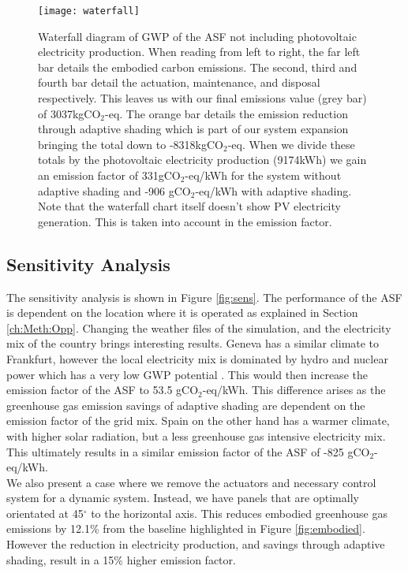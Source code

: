 \begin{figure}[H]
\begin{center}
\texttt{[image: waterfall]}
\caption{Waterfall diagram of GWP of the ASF not including photovoltaic electricity production. When reading from left to right, the far left bar details the embodied carbon emissions. The second, third and fourth bar detail the actuation, maintenance, and disposal respectively. This leaves us with our final emissions value (grey bar) of 3037kgCO$_2$-eq. The orange bar details the emission reduction through adaptive shading which is part of our system expansion bringing the total down to -8318kgCO$_2$-eq. When we divide these totals by the photovoltaic electricity production (9174kWh) we gain an emission factor of 331gCO$_2$-eq/kWh for the system without adaptive shading and -906 gCO$_2$-eq/kWh with adaptive shading. Note that the waterfall chart itself doesn't show PV electricity generation. This is taken into account in the emission factor.}

\label{fig:waterfall}
\end{center}
\end{figure}



\subsection{Sensitivity Analysis}


The sensitivity analysis is shown in Figure \ref{fig:sens}. The performance of the ASF is dependent on the location where it is operated as explained in Section \ref{ch:Meth:Opp}. Changing the weather files of the simulation, and the electricity mix of the country brings interesting results. Geneva has a similar climate to Frankfurt, however the local electricity mix is dominated by hydro and nuclear power which has a very low GWP potential \cite{itten2012life}. This would then increase the emission factor of the ASF to 53.5 gCO$_{2}$-eq/kWh. This difference arises as the greenhouse gas emission savings of adaptive shading are dependent on the emission factor of the grid mix.
Spain on the other hand has a warmer climate, with higher solar radiation, but a less greenhouse gas intensive electricity mix. This ultimately results in a similar emission factor of the ASF of -825 gCO$_{2}$-eq/kWh.\\


We also present a case where we remove the actuators and necessary control system for a dynamic system. Instead, we have panels that are optimally orientated at 45$^{\circ}$ to the horizontal axis. This reduces embodied greenhouse gas emissions by 12.1\% from the baseline highlighted in Figure \ref{fig:embodied}. However the reduction in electricity production, and savings through adaptive shading, result in a 15\% higher emission factor.\\

